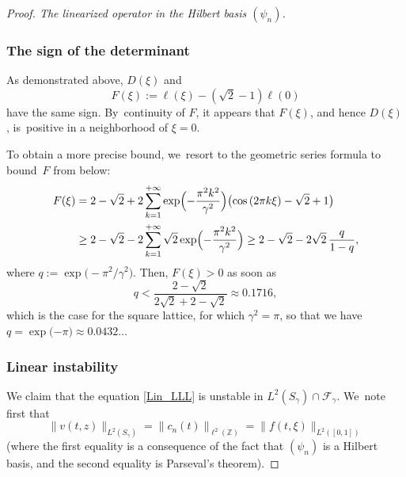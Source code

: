 \documentclass[JEP,XML,SOM,Unicode,NoFloatCountersInSection,published]{cedram}
\theoremstyle{definition}
\let\EE\exp
\newcommand{\pa}[1]{\left(#1\right)}
\newcommand{\bpa}[1]{\bigl(#1\bigr)}
\begin{document}
\begin{proof}[Proof. The linearized operator in the Hilbert basis $(\psi_n)$]
\subsubsection*{The sign of the determinant}
As demonstrated above, $D(\xi)$ and
\[
F(\xi):=\ell(\xi) -(\sqrt{2}-1)\ell(0)
\]
have the same sign. By~continuity of $F$, it appears that $F(\xi)$, and hence $D(\xi)$, is~positive in a neighborhood of $\xi=0$.

To obtain a more precise bound, we~resort to the geometric series formula to bound~$F$ from below:
\begin{align*}
F(\xi) &=2 - \sqrt{2} + 2 \sum_{k=1}^{+\infty}\EE\Bigl(-\frac{\pi^2 k^2}{\gamma^2}\Bigr) \bpa{\cos\pa{2\pi k\xi}-\sqrt{2}+1}\\
&\geq 2 - \sqrt{2} - 2 \sum_{k=1}^{+\infty}\sqrt{2}\EE\Bigl(-\frac{\pi^2 k^2}{\gamma^2}\Bigr) \geq 2 - \sqrt{2} - 2\sqrt{2}\,\frac{q}{1-q},
\end{align*}
where $q:= \EE\bigl(-{\pi^2}/{\gamma^2}\bigr)$. Then, $F(\xi) > 0$ as soon as
\[
q < \frac{2-\sqrt{2}}{2\sqrt{2}+2-\sqrt{2}} \approx 0.1716,
\]
which is the case for the square lattice, for which $\gamma^2 = \pi$, so that we have \linebreak ${q = \EE\bigl({-\pi} \bigr)\approx 0.0432\dots}$

\subsubsection*{Linear instability} We claim that the equation \eqref{Lin_LLL} is unstable in $L^2(S_\gamma) \cap \mathcal{F}_\gamma$. We~note first that
\[
\| v(t,z) \|_{L^2(S_\gamma)} = \| c_n(t) \|_{\ell^2(\mathbb{Z})} = \| f(t,\xi) \|_{L^2([0,1])}
\]
(where the first equality is a consequence of the fact that $(\psi_n)$ is a Hilbert basis, and the second equality is Parseval's theorem).


\end{proof}
\end{document}
